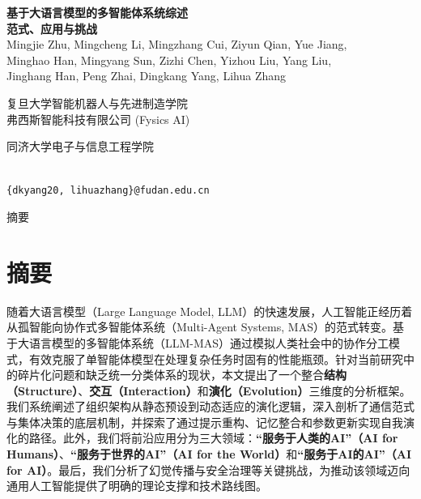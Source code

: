 \documentclass[UTF8,a4paper,12pt]{article}
\begin{document}
\begin{titlepage}
    \centering
    \vspace*{2cm}
    
    {\Huge\bfseries 基于大语言模型的多智能体系统综述}\\[0.5cm]
    {\LARGE\bfseries 范式、应用与挑战}\\[2cm]
    
    \Large
    Mingjie Zhu, Mingcheng Li, Mingzhang Cui, Ziyun Qian, Yue Jiang,\\
    Minghao Han, Mingyang Sun, Zizhi Chen, Yizhou Liu, Yang Liu,\\
    Jinghang Han, Peng Zhai, Dingkang Yang, Lihua Zhang\\[1.5cm]
    
    \normalsize
    \begin{minipage}[t]{0.45\textwidth}
        \centering
        复旦大学智能机器人与先进制造学院\\
        弗西斯智能科技有限公司 (Fysics AI)
    \end{minipage}
    \hfill
    \begin{minipage}[t]{0.45\textwidth}
        \centering
        同济大学电子与信息工程学院
    \end{minipage}\\[1cm]
    
    \texttt{\{dkyang20, lihuazhang\}@fudan.edu.cn}
    
    \vspace{2cm}
    \Large{摘要}
\end{titlepage}

\newpage
\section*{摘要}

随着大语言模型（Large Language Model, LLM）的快速发展，人工智能正经历着从孤智能向协作式多智能体系统（Multi-Agent Systems, MAS）的范式转变。基于大语言模型的多智能体系统（LLM-MAS）通过模拟人类社会中的协作分工模式，有效克服了单智能体模型在处理复杂任务时固有的性能瓶颈。针对当前研究中的碎片化问题和缺乏统一分类体系的现状，本文提出了一个整合\textbf{结构（Structure）}、\textbf{交互（Interaction）}和\textbf{演化（Evolution）}三维度的分析框架。我们系统阐述了组织架构从静态预设到动态适应的演化逻辑，深入剖析了通信范式与集体决策的底层机制，并探索了通过提示重构、记忆整合和参数更新实现自我演化的路径。此外，我们将前沿应用分为三大领域：\textbf{``服务于人类的AI''（AI for Humans）}、\textbf{``服务于世界的AI''（AI for the World）}和\textbf{``服务于AI的AI''（AI for AI）}。最后，我们分析了幻觉传播与安全治理等关键挑战，为推动该领域迈向通用人工智能提供了明确的理论支撑和技术路线图。
\end{document}
